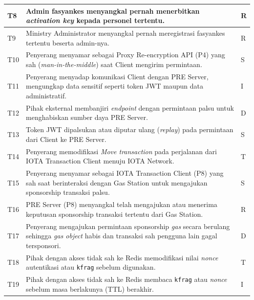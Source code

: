 \begin{xltabular}{\textwidth}{|>{\centering\arraybackslash}p{0.8cm}|X|>{\centering\arraybackslash}p{1.8cm}|}
    T8 & Admin fasyankes menyangkal pernah menerbitkan \textit{activation key} kepada personel tertentu. & R \\
    \hline

    T9 & Ministry Administrator menyangkal pernah meregistrasi fasyankes tertentu beserta admin-nya. & R \\
    \hline

    T10 & Penyerang menyamar sebagai Proxy Re-encryption API (P4) yang sah (\textit{man-in-the-middle}) saat Client mengirim permintaan. & S \\
    \hline

    T11 & Penyerang menyadap komunikasi Client dengan PRE Server, mengungkap data sensitif seperti token JWT maupun data administratif. & I \\
    \hline

    T12 & Pihak eksternal membanjiri \textit{endpoint} dengan permintaan palsu untuk menghabiskan sumber daya PRE Server. & D \\
    \hline

    T13 & Token JWT dipalsukan atau diputar ulang (\textit{replay}) pada permintaan dari Client ke PRE Server. & S \\
    \hline

    T14 & Penyerang memodifikasi \textit{Move transaction} pada perjalanan dari IOTA Transaction Client menuju IOTA Network. & T \\
    \hline

    T15 & Penyerang menyamar sebagai IOTA Transaction Client (P8) yang sah saat berinteraksi dengan Gas Station untuk mengajukan sponsorship transaksi palsu. & S \\
    \hline

    T16 & PRE Server (P8) menyangkal telah mengajukan atau menerima keputusan sponsorship transaksi tertentu dari Gas Station. & R \\
    \hline

    T17 & Penyerang mengajukan permintaan sponsorship \textit{gas} secara berulang sehingga \textit{gas object} habis dan transaksi sah pengguna lain gagal tersponsori. & D \\
    \hline

    T18 & Pihak dengan akses tidak sah ke Redis memodifikasi nilai \textit{nonce} autentikasi atau \texttt{kfrag} sebelum digunakan. & T \\
    \hline

    T19 & Pihak dengan akses tidak sah ke Redis membaca \texttt{kfrag} atau \textit{nonce} sebelum masa berlakunya (TTL) berakhir. & I \\
    \hline


\end{xltabular}
